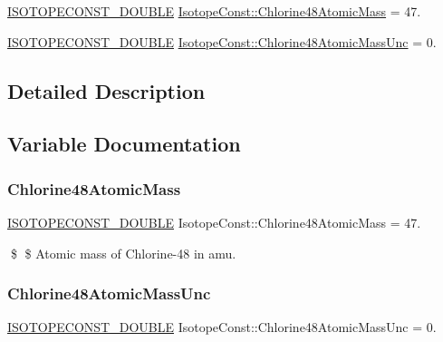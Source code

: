 \begin{DoxyCompactItemize}
\item 
\mbox{\hyperlink{group___isotope_const-_macros_ga8f45a7272ce02c0b4c65c44636ed719a}{I\+S\+O\+T\+O\+P\+E\+C\+O\+N\+S\+T\+\_\+\+D\+O\+U\+B\+LE}} \mbox{\hyperlink{group___isotope_const-_chlorine-_cl48_gae6b5f43aac6224111da4c8ea68ce9a39}{Isotope\+Const\+::\+Chlorine48\+Atomic\+Mass}} = 47.
\item 
\mbox{\hyperlink{group___isotope_const-_macros_ga8f45a7272ce02c0b4c65c44636ed719a}{I\+S\+O\+T\+O\+P\+E\+C\+O\+N\+S\+T\+\_\+\+D\+O\+U\+B\+LE}} \mbox{\hyperlink{group___isotope_const-_chlorine-_cl48_ga575fe9217ba8d65738ddcdfb0b503fd6}{Isotope\+Const\+::\+Chlorine48\+Atomic\+Mass\+Unc}} = 0.
\end{DoxyCompactItemize}


\subsection{Detailed Description}


\subsection{Variable Documentation}
\mbox{\label{group___isotope_const-_chlorine-_cl48_gae6b5f43aac6224111da4c8ea68ce9a39}} 
\subsubsection{\texorpdfstring{Chlorine48\+Atomic\+Mass}{Chlorine48AtomicMass}}
{\footnotesize\ttfamily \mbox{\hyperlink{group___isotope_const-_macros_ga8f45a7272ce02c0b4c65c44636ed719a}{I\+S\+O\+T\+O\+P\+E\+C\+O\+N\+S\+T\+\_\+\+D\+O\+U\+B\+LE}} Isotope\+Const\+::\+Chlorine48\+Atomic\+Mass = 47.}

\$ \$ Atomic mass of Chlorine-\/48 in amu. \mbox{\label{group___isotope_const-_chlorine-_cl48_ga575fe9217ba8d65738ddcdfb0b503fd6}} 
\subsubsection{\texorpdfstring{Chlorine48\+Atomic\+Mass\+Unc}{Chlorine48AtomicMassUnc}}
{\footnotesize\ttfamily \mbox{\hyperlink{group___isotope_const-_macros_ga8f45a7272ce02c0b4c65c44636ed719a}{I\+S\+O\+T\+O\+P\+E\+C\+O\+N\+S\+T\+\_\+\+D\+O\+U\+B\+LE}} Isotope\+Const\+::\+Chlorine48\+Atomic\+Mass\+Unc = 0.}

